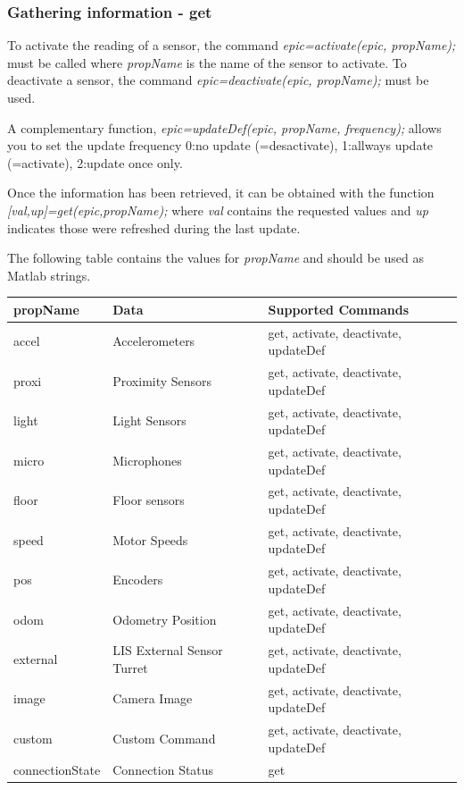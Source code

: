 \documentclass[11pt,oneside,english,a4paper]{article}
\begin{document}
\subsubsection{Gathering information - get}
\par To activate the reading of a sensor, the command \emph{epic=activate(epic, propName);} must be called where \emph{propName} is the name of the sensor to activate. To deactivate a sensor, the command \emph{epic=deactivate(epic, propName);} must be used.
\par A complementary function, \emph{epic=updateDef(epic, propName, frequency);} allows you to set the update frequency 0:no update (=desactivate), 1:allways update (=activate), 2:update once only. 
\par Once the information has been retrieved, it can be obtained with the function \newline \emph{[val,up]=get(epic,propName);} where \emph{val} contains the requested values and \emph{up} indicates those were refreshed during the last update.
\par The following table contains the values for \emph{propName} and should be used as Matlab strings.
\setlongtables
\begin{longtable}{|l|l|p{6.5cm}|}
\hline
\textbf{propName} & \textbf{Data} & \textbf{Supported Commands}\\
\hline \hline
accel & Accelerometers & get, activate, deactivate, updateDef\\
\hline
proxi & Proximity Sensors & get, activate, deactivate, updateDef\\
\hline
light & Light Sensors & get, activate, deactivate, updateDef\\
\hline
micro & Microphones & get, activate, deactivate, updateDef\\
\hline
floor & Floor sensors & get, activate, deactivate, updateDef\\
\hline
speed & Motor Speeds & get, activate, deactivate, updateDef\\
\hline
pos & Encoders & get, activate, deactivate, updateDef\\
\hline
odom & Odometry Position & get, activate, deactivate, updateDef\\
\hline
external & LIS External Sensor Turret & get, activate, deactivate, updateDef\\
\hline
image & Camera Image & get, activate, deactivate, updateDef\\
\hline
custom & Custom Command & get, activate, deactivate, updateDef\\
\hline
connectionState & Connection Status & get\\
\hline
\end{longtable}
\end{document}

